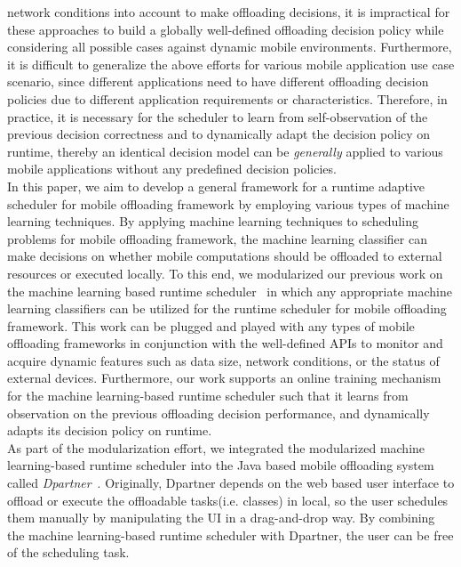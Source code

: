\documentclass[10pt, conference, compsocconf]{IEEEtran}
\begin{document}
network conditions into account to make offloading decisions, it is
impractical for these approaches to build a globally well-defined
offloading decision policy while considering all possible cases against
dynamic mobile environments.
%
Furthermore, it is difficult to generalize the above efforts for various
mobile application use case scenario, since different applications need
to have different offloading decision policies due to different
application requirements or characteristics.
%
Therefore, in practice, it is necessary for the scheduler to learn
from self-observation of the previous decision correctness and to
dynamically adapt the decision policy on runtime, thereby an identical
decision model can be \textit{generally} applied to various mobile
applications without any predefined decision policies.\\
%
\indent In this paper, we aim to develop a general framework for a
runtime adaptive scheduler for mobile offloading framework by
employing various types of machine learning techniques.
%
By applying machine learning techniques to scheduling problems
for mobile offloading framework, the machine learning classifier can
make decisions on whether mobile computations should be offloaded to
external resources or executed locally.
%
To this end, we modularized our previous work on the machine learning
based runtime scheduler~\cite{ml} in which any appropriate machine
learning classifiers can be utilized for the runtime scheduler for
mobile offloading framework.
%
This work can be plugged and played with any types of mobile offloading
frameworks in conjunction with the well-defined APIs to monitor and
acquire dynamic features such as data size, network conditions, or the
status of external devices. 
%
Furthermore, our work supports an online training mechanism for
the machine learning-based runtime scheduler such that it learns from
observation on the previous offloading decision performance, and
dynamically adapts its decision policy on runtime.\\
%
\indent As part of the modularization effort, we integrated the
modularized machine learning-based runtime scheduler into the Java based
mobile offloading system called \textit{Dpartner}~\cite{dpartner}.
%
Originally, Dpartner depends on the web based user interface to offload
or execute the offloadable tasks(i.e. classes) in local, so the user
schedules them manually by manipulating the UI in a drag-and-drop way.  
%
By combining the machine learning-based runtime scheduler with Dpartner,
the user can be free of the scheduling task.
\end{document}
